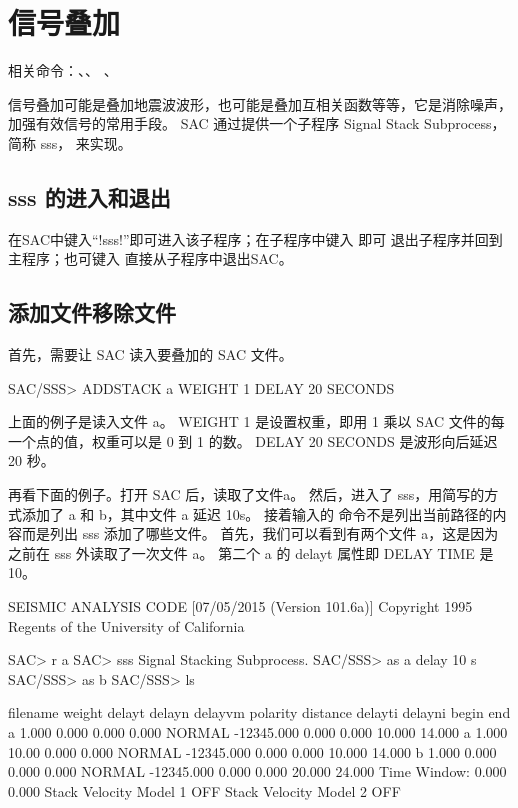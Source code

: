 \section{信号叠加}
\label{sec:stack-files}
相关命令：、、
、

信号叠加可能是叠加地震波波形，也可能是叠加互相关函数等等，它是消除噪声，加强有效信号的常用手段。
SAC 通过提供一个子程序 Signal Stack Subprocess，简称 sss， 来实现。

\subsection{sss 的进入和退出}
在SAC中键入``!sss!''即可进入该子程序；在子程序中键入  即可
退出子程序并回到主程序；也可键入  直接从子程序中退出SAC。

\subsection{添加文件移除文件}

首先，需要让 SAC 读入要叠加的 SAC 文件。

\begin{SACCode}
SAC/SSS> ADDSTACK a WEIGHT 1 DELAY 20 SECONDS
\end{SACCode}

上面的例子是读入文件 a。
WEIGHT 1 是设置权重，即用 1 乘以 SAC 文件的每一个点的值，权重可以是 0 到 1 的数。
DELAY 20 SECONDS 是波形向后延迟 20 秒。

再看下面的例子。打开 SAC 后，读取了文件a。
然后，进入了 sss，用简写的方式添加了 a 和 b，其中文件 a 延迟 10s。
接着输入的  命令不是列出当前路径的内容而是列出 sss 添加了哪些文件。
首先，我们可以看到有两个文件 a，这是因为之前在 sss 外读取了一次文件 a。
第二个 a 的 delayt 属性即 DELAY TIME 是 10。

\begin{SACCode}
SEISMIC ANALYSIS CODE [07/05/2015 (Version 101.6a)]
Copyright 1995 Regents of the University of California

SAC> r a
SAC> sss
Signal Stacking Subprocess.
SAC/SSS> as a delay 10 s
SAC/SSS> as b
SAC/SSS> ls

 filename  weight      delayt      delayn     delayvm   polarity   distance
                           delayti     delayni      begin       end
 a         1.000       0.000       0.000       0.000   NORMAL   -12345.000
                             0.000       0.000      10.000      14.000
 a         1.000       10.00       0.000       0.000   NORMAL   -12345.000
                             0.000       0.000      10.000      14.000
 b         1.000       0.000       0.000       0.000   NORMAL   -12345.000
                             0.000       0.000      20.000      24.000
 Time Window:       0.000       0.000
 Stack Velocity Model 1 OFF
 Stack Velocity Model 2 OFF
\end{SACCode}

